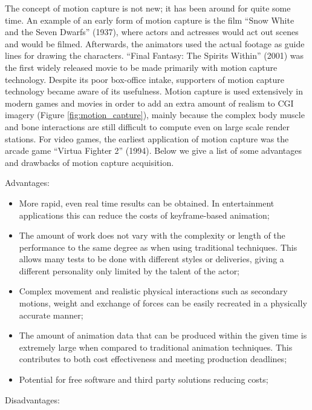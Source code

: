 \documentclass[a4paper, 12pt]{amsart}
\begin{document}
The concept of motion capture is not new; it has been around for quite some time. An example of an early form of motion capture is the film ``Snow White and the Seven Dwarfs'' (1937), where actors and actresses would act out scenes and would be filmed. Afterwards, the animators used the actual footage as guide lines for drawing the characters. ``Final Fantasy: The Spirits Within'' (2001) was the first widely released movie to be made primarily with motion capture technology. Despite its poor box-office intake, supporters of motion capture technology became aware of its usefulness. Motion capture is used extensively in modern games and movies in order to add an extra amount of realism to CGI imagery (Figure \ref{fig:motion_capture}), mainly because the complex body muscle and bone interactions are still difficult to compute even on large scale render stations. For video games, the earliest application of motion capture was the arcade game ``Virtua Fighter 2'' (1994). Below we give a list of some advantages and drawbacks of motion capture acquisition.

Advantages:

\begin{itemize}
\item More rapid, even real time results can be obtained. In entertainment applications this can reduce the costs of keyframe-based animation;
\item The amount of work does not vary with the complexity or length of the performance to the same degree as when using traditional techniques. This allows many tests to be done with different styles or deliveries, giving a different personality only limited by the talent of the actor;
\item Complex movement and realistic physical interactions such as secondary motions, weight and exchange of forces can be easily recreated in a physically accurate manner;
\item The amount of animation data that can be produced within the given time is extremely large when compared to traditional animation techniques. This contributes to both cost effectiveness and meeting production deadlines;
\item Potential for free software and third party solutions reducing costs;
\end{itemize}

Disadvantages:
\end{document}

